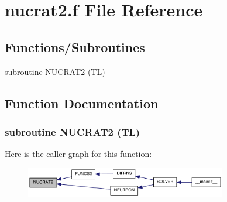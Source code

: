 \hypertarget{nucrat2_8f}{
\section{nucrat2.f File Reference}
\label{nucrat2_8f}
}
\subsection*{Functions/Subroutines}
\begin{DoxyCompactItemize}
\item 
subroutine \hyperlink{nucrat2_8f_ad6195d9d65f55622273b59b1f1e997fe}{NUCRAT2} (TL)
\end{DoxyCompactItemize}


\subsection{Function Documentation}
\hypertarget{nucrat2_8f_ad6195d9d65f55622273b59b1f1e997fe}{
\subsubsection[{NUCRAT2}]{\setlength{\rightskip}{0pt plus 5cm}subroutine NUCRAT2 (TL)}}
\label{nucrat2_8f_ad6195d9d65f55622273b59b1f1e997fe}


Here is the caller graph for this function:\nopagebreak
\begin{figure}[H]
\begin{center}
\leavevmode
\includegraphics[width=249pt]{nucrat2_8f_ad6195d9d65f55622273b59b1f1e997fe_icgraph}
\end{center}
\end{figure}
